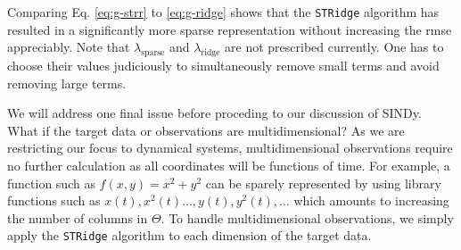 \documentclass[
]{article}
\begin{document}
Comparing Eq. \eqref{eq:g-strr} to \eqref{eq:g-ridge} shows that the
\texttt{STRidge} algorithm has resulted in a significantly more sparse
representation without increasing the rmse appreciably. Note that
\(\lambda_\text{sparse}\) and \(\lambda_\text{ridge}\) are not
prescribed currently. One has to choose their values judiciously to
simultaneously remove small terms and avoid removing large terms.

We will address one final issue before proceding to our discussion of
SINDy. What if the target data or observations are multidimensional? As
we are restricting our focus to dynamical systems, multidimensional
observations require no further calculation as all coordinates will be
functions of time. For example, a function such as
\(f(x, y) = x^2 + y^2\) can be sparely represented by using library
functions such as \(x(t), x^2(t) \dots, y(t), y^2(t), \dots\) which
amounts to increasing the number of columns in \(\Theta\). To handle
multidimensional observations, we simply apply the \texttt{STRidge}
algorithm to each dimension of the target data.
\end{document}
